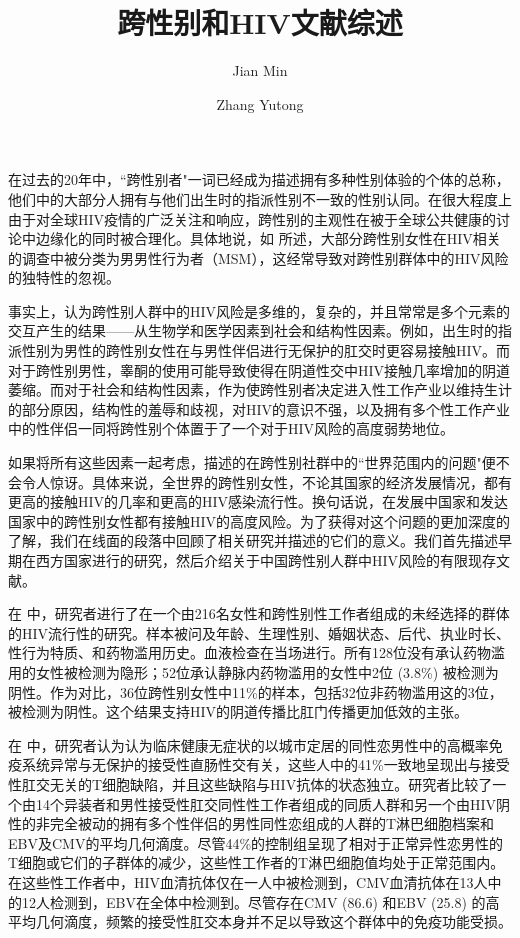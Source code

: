 \documentclass[5p]{elsarticle}
\begin{document}
\begin{frontmatter}
\title{跨性别和HIV文献综述}
\author[1]{Jian Min}
\author[2]{Zhang Yutong}
\end{frontmatter}

在过去的20年中，``跨性别者"一词已经成为描述拥有多种性别体验的个体的总称，他们中的大部分人拥有与他们出生时的指派性别不一致的性别认同。在很大程度上由于对全球HIV疫情的广泛关注和响应，跨性别的主观性在被于全球公共健康的讨论中边缘化的同时被合理化。具体地说，如 \cite{poteat2015}所述，大部分跨性别女性在HIV相关的调查中被分类为男男性行为者（MSM），这经常导致对跨性别群体中的HIV风险的独特性的忽视。

事实上，\cite{poteat2015}认为跨性别人群中的HIV风险是多维的，复杂的，并且常常是多个元素的交互产生的结果------从生物学和医学因素到社会和结构性因素。例如，出生时的指派性别为男性的跨性别女性在与男性伴侣进行无保护的肛交时更容易接触HIV。而对于跨性别男性，睾酮的使用可能导致使得在阴道性交中HIV接触几率增加的阴道萎缩。而对于社会和结构性因素，作为使跨性别者决定进入性工作产业以维持生计的部分原因，结构性的羞辱和歧视，对HIV的意识不强，以及拥有多个性工作产业中的性伴侣一同将跨性别个体置于了一个对于HIV风险的高度弱势地位。

如果将所有这些因素一起考虑，\cite{baral2013}描述的在跨性别社群中的``世界范围内的问题"便不会令人惊讶。具体来说，全世界的跨性别女性，不论其国家的经济发展情况，都有更高的接触HIV的几率和更高的HIV感染流行性。换句话说，在发展中国家和发达国家中的跨性别女性都有接触HIV的高度风险。为了获得对这个问题的更加深度的了解，我们在线面的段落中回顾了相关研究并描述的它们的意义。我们首先描述早期在西方国家进行的研究，然后介绍关于中国跨性别人群中HIV风险的有限现存文献。

在 \cite{modan1992}中，研究者进行了在一个由216名女性和跨性别性工作者组成的未经选择的群体的HIV流行性的研究。样本被问及年龄、生理性别、婚姻状态、后代、执业时长、性行为特质、和药物滥用历史。血液检查在当场进行。所有128位没有承认药物滥用的女性被检测为隐形；52位承认静脉内药物滥用的女性中2位 (3.8\%) 被检测为阴性。作为对比，36位跨性别女性中11\%的样本，包括32位非药物滥用这的3位，被检测为阴性。这个结果支持HIV的阴道传播比肛门传播更加低效的主张。

在 \cite{handzel1990}中，研究者认为认为临床健康无症状的以城市定居的同性恋男性中的高概率免疫系统异常与无保护的接受性直肠性交有关，这些人中的41\%一致地呈现出与接受性肛交无关的T细胞缺陷，并且这些缺陷与HIV抗体的状态独立。研究者比较了一个由14个异装者和男性接受性肛交同性性工作者组成的同质人群和另一个由HIV阴性的非完全被动的拥有多个性伴侣的男性同性恋组成的人群的T淋巴细胞档案和EBV及CMV的平均几何滴度。尽管44\%的控制组呈现了相对于正常异性恋男性的T细胞或它们的子群体的减少，这些性工作者的T淋巴细胞值均处于正常范围内。在这些性工作者中，HIV血清抗体仅在一人中被检测到，CMV血清抗体在13人中的12人检测到，EBV在全体中检测到。尽管存在CMV (86.6) 和EBV (25.8) 的高平均几何滴度，频繁的接受性肛交本身并不足以导致这个群体中的免疫功能受损。 
\end{document}
